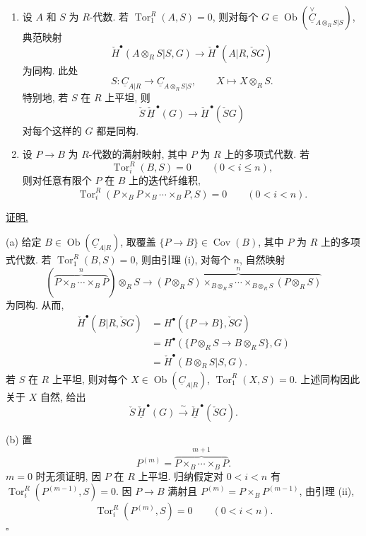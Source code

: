 \begin{enumerate}[label=(\alph*)]
\item 设 $A$ 和 $S$ 为 $R$-代数.
若 $\operatorname{Tor}_1^R(A,S)=0$, 则对每个
$G\in\operatorname{Ob}(\overset{\vee}{\underline C}_{A\otimes_RS|S})$, 典范映射
\[
 \check H^{\bullet}(A\otimes_RS|S,G)
 \longrightarrow\check H^{\bullet}(A|R,\check SG)
\]
为同构. 此处
\[
 S:\underline C_{A|R}\longrightarrow
 \underline C_{A\otimes_RS|S},
 \qquad X\longmapsto X\otimes_RS.
\]
特别地, 若 $S$ 在 $R$ 上平坦, 则
\[
 \check S\,\check{\underline H}^{\,\bullet}(G)
 \longrightarrow
 \check{\underline H}^{\,\bullet}(\check SG)
\]
对每个这样的 $G$ 都是同构.

\item 设 $P\longrightarrow B$ 为 $R$-代数的满射映射,
其中 $P$ 为 $R$ 上的多项式代数. 若
\[
 \operatorname{Tor}_i^R(B,S)=0\qquad(0<i\leq n),
\]
则对任意有限个 $P$ 在 $B$ 上的迭代纤维积,
\[
 \operatorname{Tor}_i^R
 (P\times_B P\times_B\cdots\times_B P,S)=0
 \qquad(0<i<n).
\]
\end{enumerate}

\underline{证明.}

(a) 给定 $B\in\operatorname{Ob}(\underline C_{A|R})$,
取覆盖 $\{P\longrightarrow B\}\in\operatorname{Cov}(B)$,
其中 $P$ 为 $R$ 上的多项式代数.
若 $\operatorname{Tor}_1^R(B,S)=0$, 则由引理 (i),
对每个 $n$, 自然映射
\[
 \left(\overbrace{P\times_B\cdots\times_BP}^{n}\right)\otimes_RS
 \longrightarrow
 \overbrace{(P\otimes_RS)\times_{B\otimes_RS}\cdots
 \times_{B\otimes_RS}(P\otimes_RS)}^{n}
\]
为同构. 从而,
\begin{align*}
 \check H^{\bullet}(B|R,\check SG)
 &=H^{\bullet}(\{P\longrightarrow B\},\check SG)\\
 &=H^{\bullet}(\{P\otimes_RS\longrightarrow B\otimes_RS\},G)\\
 &=\check H^{\bullet}(B\otimes_RS|S,G).
\end{align*}
若 $S$ 在 $R$ 上平坦, 则对每个
$X\in\operatorname{Ob}(\underline C_{A|R})$,
$\operatorname{Tor}_1^R(X,S)=0$.
上述同构因此关于 $X$ 自然, 给出
\[
 \check S\,\check{\underline H}^{\,\bullet}(G)
 \xrightarrow{\ \sim\ }
 \check{\underline H}^{\,\bullet}(\check SG).
\]

(b) 置
\[
 P^{(m)}=\overbrace{P\times_B\cdots\times_BP}^{m+1}.
\]
$m=0$ 时无须证明, 因 $P$ 在 $R$ 上平坦.
归纳假定对 $0<i<n$ 有 $\operatorname{Tor}_i^R(P^{(m-1)},S)=0$.
因 $P\longrightarrow B$ 满射且 $P^{(m)}=P\times_BP^{(m-1)}$,
由引理 (ii),
\[
 \operatorname{Tor}_i^R(P^{(m)},S)=0\qquad(0<i<n).
\]
\hfill$\square$

